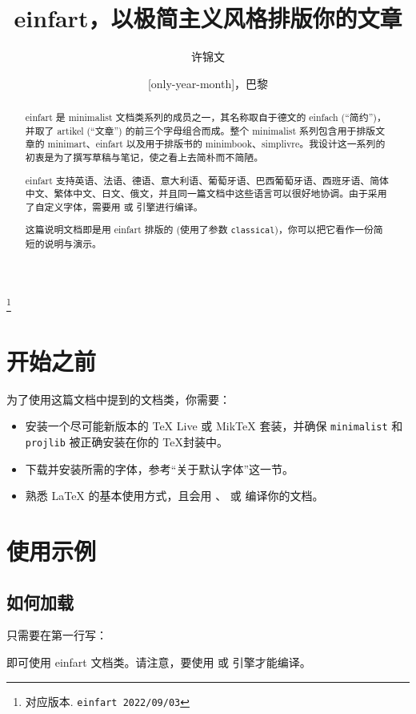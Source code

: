 \documentclass[classical, simple name]{einfart}
\newcommand{\classoption}[1]{\texttt{\textcolor{code-option}{#1}}}
\providecommand{\minimalist}{\textsf{minimalist}}
\providecommand{\minimart}{\textsf{minimart}}
\providecommand{\minimbook}{\textsf{minimbook}}
\providecommand{\einfart}{\textsf{einfart}}
\providecommand{\simplivre}{\textsf{simplivre}}
\let\LevelOneTitle\section
\let\LevelTwoTitle\subsection
\begin{document}
\def\PackageVersion{2022/09/03}

\title{\einfart{}，以极简主义风格排版你的文章}
\author{许锦文}
\thanks{对应版本. \texttt{\einfart{} \PackageVersion}}
\date{\TheDate{\PackageVersion}[only-year-month]，巴黎}

\maketitle

\begin{abstract}
    \einfart{} 是 \minimalist{} 文档类系列的成员之一，其名称取自于德文的 einfach (``简约'')，并取了 artikel (``文章'') 的前三个字母组合而成。整个 \minimalist{} 系列包含用于排版文章的 \minimart{}、\einfart{} 以及用于排版书的 \minimbook{}、\simplivre{}。我设计这一系列的初衷是为了撰写草稿与笔记，使之看上去简朴而不简陋。

    \einfart{} 支持英语、法语、德语、意大利语、葡萄牙语、巴西葡萄牙语、西班牙语、简体中文、繁体中文、日文、俄文，并且同一篇文档中这些语言可以很好地协调。由于采用了自定义字体，需要用  或  引擎进行编译。

    这篇说明文档即是用 \einfart{} 排版的 (使用了参数 \classoption{classical})，你可以把它看作一份简短的说明与演示。
\end{abstract}


\setcounter{tocdepth}{2}
{\tableofcontents}


\medskip
\LevelOneTitle*{开始之前}
为了使用这篇文档中提到的文档类，你需要：
\begin{itemize}
    \item 安装一个尽可能新版本的 TeX Live 或 MikTeX 套装，并确保 \texttt{minimalist} 和 \texttt{projlib} 被正确安装在你的 \TeX 封装中。
    \item 下载并安装所需的字体，参考“关于默认字体”这一节。
    \item 熟悉 \LaTeX{} 的基本使用方式，且会用 、 或  编译你的文档。
\end{itemize}


\LevelOneTitle{使用示例}

\LevelTwoTitle{如何加载}

只需要在第一行写：


即可使用 \einfart{} 文档类。请注意，要使用  或  引擎才能编译。
\end{document}
